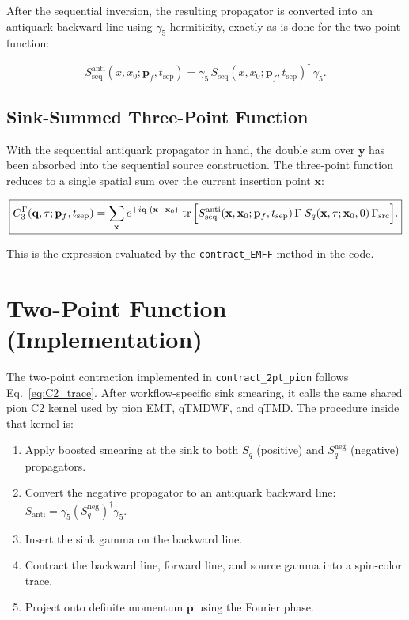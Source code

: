 \documentclass[11pt,a4paper]{article}
\newcommand{\gfive}{\gamma_5}
\newcommand{\gsrc}{\Gamma_{\text{src}}}
\newcommand{\gcur}{\Gamma}
\newcommand{\Sq}{S_{q}}
\newcommand{\Santi}{S_{\text{anti}}}
\newcommand{\Sseq}{S_{\text{seq}}}
\begin{document}
After the sequential inversion, the resulting propagator is converted into an
antiquark backward line using \(\gfive\)-hermiticity, exactly as is done for the
two-point function:

\begin{equation}
\Sseq^{\text{anti}}(x, x_0; \mathbf{p}_f, t_{\text{sep}})
  = \gfive \, \Sseq(x, x_0; \mathbf{p}_f, t_{\text{sep}})^\dagger \, \gfive .
\label{eq:Sseq_anti}
\end{equation}

\subsection{Sink-Summed Three-Point Function}

With the sequential antiquark propagator in hand, the double sum over \(\mathbf{y}\)
has been absorbed into the sequential source construction.  The three-point
function reduces to a single spatial sum over the current insertion point
\(\mathbf{x}\):

\begin{equation}
\boxed{
C_3^\Gamma(\mathbf{q}, \tau; \mathbf{p}_f, t_{\text{sep}})
  = \sum_{\mathbf{x}}
    e^{+i\mathbf{q}\cdot(\mathbf{x}-\mathbf{x}_0)} \,
    \tr\Big[
      \Sseq^{\text{anti}}(\mathbf{x}, \mathbf{x}_0; \mathbf{p}_f, t_{\text{sep}}) \,
      \gcur \;
      \Sq(\mathbf{x}, \tau; \mathbf{x}_0, 0) \,
      \gsrc
    \Big] .
}
\label{eq:C3_seq}
\end{equation}

This is the expression evaluated by the \texttt{contract\_EMFF} method in the
code.


\section{Two-Point Function (Implementation)}

The two-point contraction implemented in \texttt{contract\_2pt\_pion} follows
Eq.~\eqref{eq:C2_trace}.  After workflow-specific sink smearing, it calls the
same shared pion C2 kernel used by pion EMT, qTMDWF, and qTMD.  The procedure
inside that kernel is:

\begin{enumerate}[nosep]
  \item Apply boosted smearing at the sink to both \(\Sq\) (positive) and
        \(\Sq^{\text{neg}}\) (negative) propagators.
  \item Convert the negative propagator to an antiquark backward line:
        \(\Santi = \gfive (\Sq^{\text{neg}})^\dagger \gfive\).
  \item Insert the sink gamma on the backward line.
  \item Contract the backward line, forward line, and source gamma into a
        spin-color trace.
  \item Project onto definite momentum \(\mathbf{p}\) using the Fourier phase.
\end{enumerate}
\end{document}
